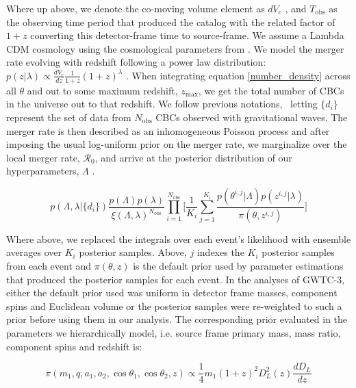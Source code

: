 \noindent
Where up above, we denote the co-moving volume element as $dV_c$ \citep{hogg_cosmo}, and $T_\mathrm{obs}$ as the observing time period that produced the 
catalog with the related factor of $1+z$ converting this detector-frame time to source-frame. We assume a Lambda CDM cosmology using 
the cosmological parameters from \citet{Planck2015}. We model the merger rate evolving with redshift following a power law distribution: 
$p(z|\lambda) \propto \frac{dV_c}{dz}\frac{1}{1+z}(1+z)^\lambda$ \cite{Fishbach_2018redshift}. When integrating equation \ref{number_density} across all $\theta$
and out to some maximum redshift, $z_\mathrm{max}$, we get the total number of CBCs in the universe out to that redshift. We follow previous notations, \
letting $\{d_i\}$ represent the set of data from $N_\mathrm{obs}$ CBCs observed with gravitational waves. The merger rate is then described as an inhomogeneous 
Poisson process and after imposing the usual log-uniform prior on the merger rate, we marginalize over the local merger rate, $\mathcal{R}_0$, and arrive at the posterior
distribution of our hyperparameters, $\Lambda$ \citep{Mandel_2019, Vitale_2021}.

\begin{equation}
    p\left(\Lambda, \lambda | \{d_i\}\right) \frac{p(\Lambda)p(\lambda)}{\xi(\Lambda,\lambda)^{N_\mathrm{obs}}} \prod_{i=1}^{N_\mathrm{obs}} \bigg[ \frac{1}{K_i} \sum_{j=1}^{K_i} \frac{p(\theta^{i,j}|\Lambda)p(z^{i,j}|\lambda)}{\pi(\theta, z^{i,j})} \bigg]
\end{equation}

\noindent
Where above, we replaced the integrals over each event's likelihood with ensemble averages over $K_i$ posterior samples. Above, $j$
indexes the $K_i$ posterior samples from each event and $\pi(\theta, z)$ is the default prior used by parameter estimations that 
produced the posterior samples for each event. In the analyses of GWTC-3, either the default prior used was uniform in detector frame masses, 
component spins and Euclidean volume or the posterior samples were re-weighted to such a prior before using them in our analysis. 
The corresponding prior evaluated in the parameters we hierarchically model, i.e. source frame primary mass, mass ratio, component spins and redshift is:

\begin{equation}
    \pi(m_1, q, a_1, a_2, \cos{\theta_1}, \cos{\theta_2}, z) \propto \frac{1}{4} m_1 (1+z)^2 D_L^2(z) \frac{dD_L}{dz}
\end{equation}

